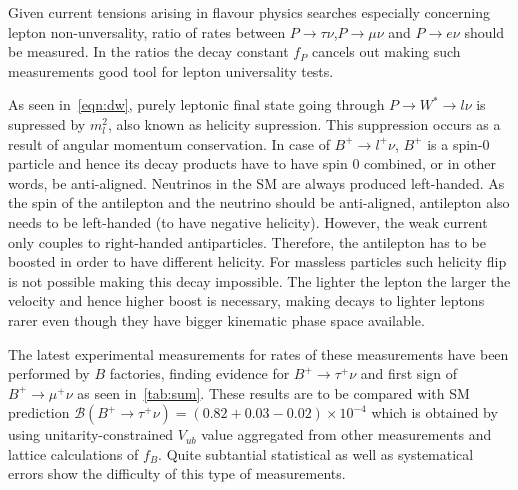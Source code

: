 Given current tensions arising in flavour physics searches especially concerning lepton non-unversality, ratio of rates between $P\rightarrow\tau\nu$,$P\rightarrow\mu\nu$ and $P\rightarrow e\nu$ should be measured. In the ratios the decay constant $f_{P}$ cancels out making such measurements good tool for lepton universality tests.

As seen in~\autoref{eqn:dw}, purely leptonic final state going through $P\rightarrow W^{*}\rightarrow l \nu$ is supressed by $m^{2}_{l}$, also known as helicity supression. This suppression occurs as a result of angular momentum conservation. In case of $B^{+}\rightarrow l^{+} \nu$, $B^{+}$ is a spin-0 particle and hence its decay products have to have spin 0 combined, or in other words, be anti-aligned. Neutrinos in the SM are always produced left-handed. As the spin of the antilepton and the neutrino should be anti-aligned, antilepton also needs to be left-handed (to have negative helicity). However, the weak current only couples to right-handed antiparticles. Therefore, the antilepton has to be boosted in order to have different helicity. For massless particles such helicity flip is not possible making this decay impossible. The lighter the lepton the larger the velocity and hence higher boost is necessary, making decays to lighter leptons rarer even though they have bigger kinematic phase space available.

The latest experimental measurements for rates of these measurements have been performed by $B$ factories, finding evidence for $B^{+}\rightarrow \tau^{+}\nu$ and first sign of $B^{+}\rightarrow \mu^{+}\nu$ as seen in~\autoref{tab:sum}. These results are to be compared with SM prediction $\mathcal{B}(B^{+}\rightarrow \tau^{+}\nu) = (0.82+0.03-0.02)\times10^{-4}$\cite{Charles:2004jd} which is obtained by using unitarity-constrained $V_{ub}$ value aggregated from other measurements and lattice calculations of $f_{B}$. Quite subtantial statistical as well as systematical errors show the difficulty of this type of measurements. 

